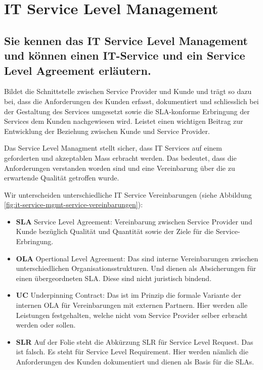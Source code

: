 \section{IT Service Level Management}

\subsection{Sie kennen das IT Service Level Management und können einen IT-Service und ein Service Level Agreement erläutern.}
Bildet die Schnittstelle zwischen Service Provider und Kunde und trägt so dazu bei, dass die Anforderungen des Kunden erfasst, dokumentiert und schliesslich bei der Gestaltung des Services umgesetzt sowie die SLA-konforme Erbringung der Services dem Kunden nachgewiesen wird. Leistet einen wichtigen Beitrag zur Entwicklung der Beziehung zwischen Kunde und Service Provider.

Das Service Level Managment stellt sicher, dass IT Services auf einem geforderten und akzeptablen Mass erbracht werden. Das bedeutet, dass die Anforderungen verstanden worden sind und eine Vereinbarung über die zu erwartende Qualität getroffen wurde.

Wir unterscheiden unterschiedliche IT Service Vereinbarungen (siehe Abbildung \ref{fig:it-service-mgmt-service-vereinbarungen}):

\begin{itemize}
	\item \textbf{SLA} Service Level Agreement: Vereinbarung zwischen Service Provider und Kunde bezüglich Qualität und Quantität sowie der Ziele für die Service-Erbringung.
	\item \textbf{OLA} Opertional Level Agreement: Das sind interne Vereinbarungen zwischen unterschiedlichen Organisationsstrukturen. Und dienen als Absicherungen für einen übergeordneten SLA. Diese sind nicht juristisch bindend.
	\item \textbf{UC} Underpinning Contract: Das ist im Prinzip die formale Variante der internen OLA für Vereinbarungen mit externen Partnern. Hier werden alle Leistungen festgehalten, welche nicht vom Service Provider selber erbracht werden oder sollen.
	\item \textbf{SLR} Auf der Folie steht die Abkürzung SLR für Service Level Request. Das ist falsch. Es steht für Service Level Requirement. Hier werden nämlich die Anforderungen des Kunden dokumentiert und dienen als Basis für die SLAs.
\end{itemize}

